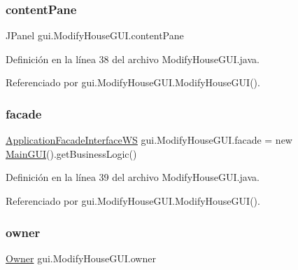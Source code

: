 \subsubsection{\texorpdfstring{contentPane}{contentPane}}
{\footnotesize\ttfamily J\+Panel gui.\+Modify\+House\+G\+U\+I.\+content\+Pane\hspace{0.3cm}{\ttfamily [private]}}



Definición en la línea 38 del archivo Modify\+House\+G\+U\+I.\+java.



Referenciado por gui.\+Modify\+House\+G\+U\+I.\+Modify\+House\+G\+U\+I().

\mbox{\label{classgui_1_1_modify_house_g_u_i_a2272c7d4931bdf3dac35d8dc6496978f}} 
\subsubsection{\texorpdfstring{facade}{facade}}
{\footnotesize\ttfamily \mbox{\hyperlink{interfacebusiness_logic_1_1_application_facade_interface_w_s}{Application\+Facade\+Interface\+WS}} gui.\+Modify\+House\+G\+U\+I.\+facade = new \mbox{\hyperlink{classgui_1_1_main_g_u_i}{Main\+G\+UI}}().get\+Business\+Logic()\hspace{0.3cm}{\ttfamily [private]}}



Definición en la línea 39 del archivo Modify\+House\+G\+U\+I.\+java.



Referenciado por gui.\+Modify\+House\+G\+U\+I.\+Modify\+House\+G\+U\+I().

\mbox{\label{classgui_1_1_modify_house_g_u_i_a126db8210cd615dca1929c2f258ff58c}} 
\subsubsection{\texorpdfstring{owner}{owner}}
{\footnotesize\ttfamily \mbox{\hyperlink{classdomain_1_1_owner}{Owner}} gui.\+Modify\+House\+G\+U\+I.\+owner\hspace{0.3cm}{\ttfamily [private]}}



